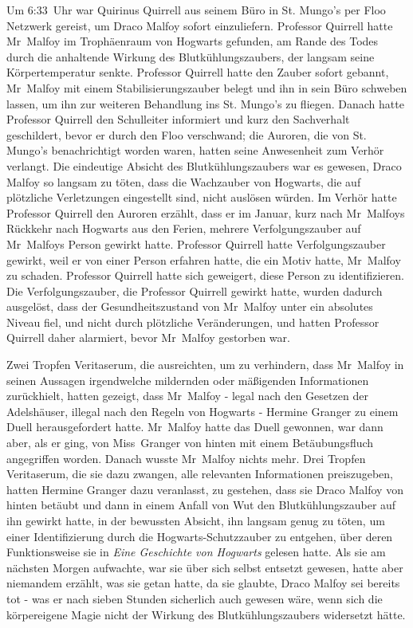 {Um 6:33~Uhr war Quirinus Quirrell aus seinem Büro in St. Mungo's per Floo Netzwerk gereist, um Draco Malfoy sofort einzuliefern. Professor Quirrell hatte Mr~Malfoy im Trophäenraum von Hogwarts gefunden, am Rande des Todes durch die anhaltende Wirkung des Blutkühlungszaubers, der langsam seine Körpertemperatur senkte. Professor Quirrell hatte den Zauber sofort gebannt, Mr~Malfoy mit einem Stabilisierungszauber belegt und ihn in sein Büro schweben lassen, um ihn zur weiteren Behandlung ins St. Mungo's zu fliegen. Danach hatte Professor Quirrell den Schulleiter informiert und kurz den Sachverhalt geschildert, bevor er durch den Floo verschwand; die Auroren, die von St. Mungo's benachrichtigt worden waren, hatten seine Anwesenheit zum Verhör verlangt. Die eindeutige Absicht des Blutkühlungszaubers war es gewesen, Draco Malfoy so langsam zu töten, dass die Wachzauber von Hogwarts, die auf plötzliche Verletzungen eingestellt sind, nicht auslösen würden. Im Verhör hatte Professor Quirrell den Auroren erzählt, dass er im Januar, kurz nach Mr~Malfoys Rückkehr nach Hogwarts aus den Ferien, mehrere Verfolgungszauber auf Mr~Malfoys Person gewirkt hatte. Professor Quirrell hatte Verfolgungszauber gewirkt, weil er von einer Person erfahren hatte, die ein Motiv hatte, Mr~Malfoy zu schaden. Professor Quirrell hatte sich geweigert, diese Person zu identifizieren. Die Verfolgungszauber, die Professor Quirrell gewirkt hatte, wurden dadurch ausgelöst, dass der Gesundheitszustand von Mr~Malfoy unter ein absolutes Niveau fiel, und nicht durch plötzliche Veränderungen, und hatten Professor Quirrell daher alarmiert, bevor Mr~Malfoy gestorben war.

Zwei Tropfen Veritaserum, die ausreichten, um zu verhindern, dass Mr~Malfoy in seinen Aussagen irgendwelche mildernden oder mäßigenden Informationen zurückhielt, hatten gezeigt, dass Mr~Malfoy - legal nach den Gesetzen der Adelshäuser, illegal nach den Regeln von Hogwarts - Hermine Granger zu einem Duell herausgefordert hatte. Mr~Malfoy hatte das Duell gewonnen, war dann aber, als er ging, von Miss~Granger von hinten mit einem Betäubungsfluch angegriffen worden. Danach wusste Mr~Malfoy nichts mehr. Drei Tropfen Veritaserum, die sie dazu zwangen, alle relevanten Informationen preiszugeben, hatten Hermine Granger dazu veranlasst, zu gestehen, dass sie Draco Malfoy von hinten betäubt und dann in einem Anfall von Wut den Blutkühlungszauber auf ihn gewirkt hatte, in der bewussten Absicht, ihn langsam genug zu töten, um einer Identifizierung durch die Hogwarts-Schutzzauber zu entgehen, über deren Funktionsweise sie in \emph{Eine Geschichte von Hogwarts} gelesen hatte. Als sie am nächsten Morgen aufwachte, war sie über sich selbst entsetzt gewesen, hatte aber niemandem erzählt, was sie getan hatte, da sie glaubte, Draco Malfoy sei bereits tot - was er nach sieben Stunden sicherlich auch gewesen wäre, wenn sich die körpereigene Magie nicht der Wirkung des Blutkühlungszaubers widersetzt hätte.

}
